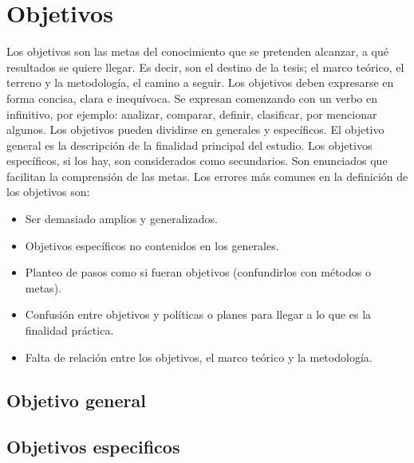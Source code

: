 \section{Objetivos}\label{secc:obj}
Los objetivos son las metas del conocimiento que se pretenden alcanzar, a qué resultados se quiere llegar. Es decir, son el destino de la tesis; el marco teórico, el terreno y la metodología, el camino a seguir. Los objetivos deben expresarse en forma concisa, clara e inequívoca. Se expresan comenzando con un verbo en infinitivo, por ejemplo: analizar, comparar, definir, clasificar, por mencionar algunos.
Los objetivos pueden dividirse en generales y específicos. El objetivo general es la descripción de la finalidad principal del estudio. Los objetivos específicos, si los hay, son considerados como secundarios. Son enunciados que facilitan la comprensión de las metas.
Los errores más comunes en la definición de los objetivos son:


\begin{itemize}
    \item Ser demasiado amplios y generalizados.
    \item Objetivos específicos no contenidos en los generales.
    \item Planteo de pasos como si fueran objetivos (confundirlos con métodos o metas).
		\item Confusión entre objetivos y políticas o planes para llegar a lo que es la finalidad práctica.
		\item Falta de relación entre los objetivos, el marco teórico y la metodología.
\end{itemize}

\subsection{Objetivo general}\label{sssec: objg}
\subsection{Objetivos especificos}\label{sssec: obje}

\newpage
